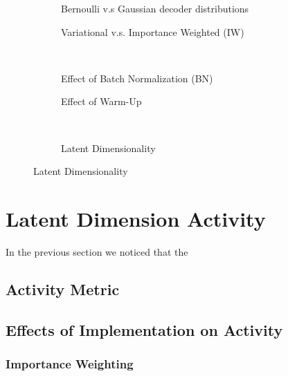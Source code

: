\documentclass{article} %
\begin{document}
\begin{figure}
\captionsetup[subfigure]{justification=centering}
    \centering
     \begin{subfigure}[b]{0.45\textwidth}
    \resizebox{\linewidth}{!}{}
    \caption{Bernoulli v.s Gaussian decoder distributions}
    \label{fig:bergau}
    \end{subfigure}
    \hfill
    \begin{subfigure}[b]{0.45\textwidth}
    \resizebox{\linewidth}{!}{}
    \caption{Variational v.s. Importance Weighted (IW)}
    \label{fig:variw}
    \end{subfigure}\\[0.3in]
    \begin{subfigure}[b]{0.45\textwidth}
    \resizebox{\linewidth}{!}{}
    \caption{Effect of Batch Normalization (BN)}
    \label{fig:bncost}
    \end{subfigure}
    \hfill
    \begin{subfigure}[b]{0.45\textwidth}
    \resizebox{\linewidth}{!}{}
    \caption{Effect of Warm-Up}
    \label{fig:wucost}
    \end{subfigure}\\[0.3in]
    \begin{subfigure}[b]{0.45\textwidth}
    \resizebox{\linewidth}{!}{}
    \caption{Latent Dimensionality}
    \label{fig:latdimcost}
    \end{subfigure}
\end{figure}

\section{Latent Dimension Activity}
In the previous section we noticed that the 
\subsection{Activity Metric}
\subsection{Effects of Implementation on Activity}
\subsubsection{Importance Weighting}
%
%
%
\end{document}
